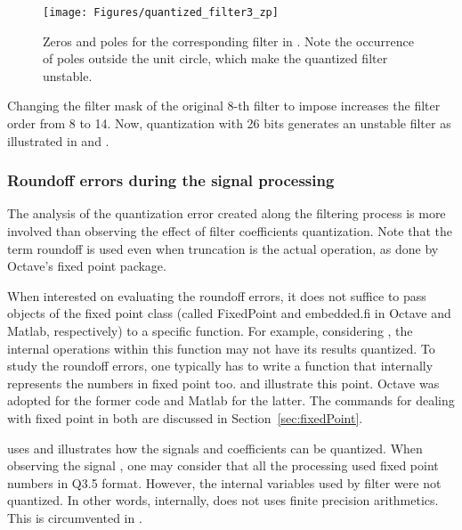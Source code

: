 \begin{figure}
\centering
\texttt{[image: Figures/quantized\_filter3\_zp]}
\caption{Zeros and poles for the corresponding filter in . Note the occurrence of poles outside the unit circle, which make the quantized filter  unstable.\label{fig:quantized_filter3_zp}}
\end{figure}

Changing the filter mask of the original 8-th filter to impose  increases the filter order from 8 to 14. Now, quantization with 26 bits generates an unstable filter as illustrated in  and .

\subsubsection{Roundoff errors during the signal processing}

%
The analysis of the quantization error created along the filtering process is more involved than observing the effect of filter coefficients quantization. Note that the term roundoff is used even when truncation is the actual operation, as done by Octave's fixed point package.

When interested on evaluating the roundoff errors, it does not suffice to pass objects of the fixed point class (called FixedPoint and embedded.fi in Octave and Matlab, respectively) to a specific function. For example, considering  , the internal operations within this function may not have its results quantized. To study the roundoff errors, one typically has to write a function that internally represents the numbers in fixed point too.
 and  illustrate this point. Octave was adopted for the former code and Matlab for the latter. The commands for dealing with fixed point in both are discussed in Section~\ref{sec:fixedPoint}.



 uses  and illustrates how the signals and coefficients can be quantized. When observing the signal , one may consider that all the processing used fixed point numbers in Q3.5 format. However, the internal variables used by filter were not quantized.
In other words, internally,  does not uses finite precision arithmetics. This is circumvented in .

